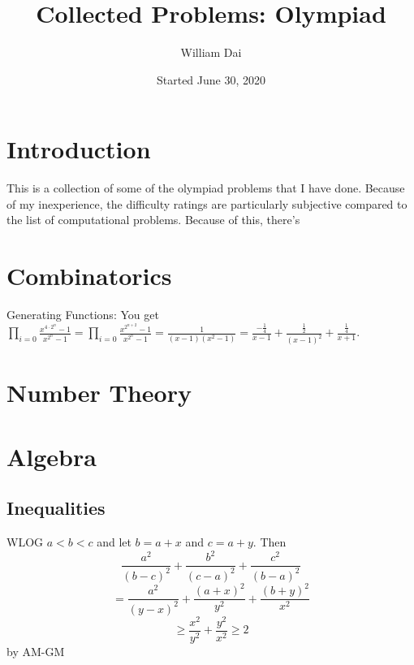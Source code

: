 \documentclass[11pt]{article}
\title{Collected Problems: Olympiad}
\author{William Dai}
\date{Started June 30, 2020}
\begin{document}
\maketitle

\section{Introduction}
This is a collection of some of the olympiad problems that I have done. Because of my inexperience, the difficulty ratings are particularly subjective compared to the list of computational problems. Because of this, there\rq{s}
\section{Combinatorics}

\begin{sol} Generating Functions: You get $\prod_{i=0} \frac{x^{4\cdot 2^{n}}-1}{x^{2^n}-1}= \prod_{i=0} \frac{x^{2^{n+2}}-1}{x^{2^n}-1}=\frac{1}{(x-1)(x^2-1)}=\frac{-\frac{1}{4}}{x-1}+\frac{\frac{1}{2}}{(x-1)^2}+\frac{\frac{1}{4}}{x+1}.$
\end{sol}


\setcounter{problem}{0}
\section{Number Theory}

\setcounter{problem}{0}
\section{Algebra}

\subsection{Inequalities}

\sol WLOG $a<b<c$ and let $b=a+x$ and $c=a+y$. Then
$$\frac{a^2}{(b-c)^2}+\frac{b^2}{(c-a)^2}+\frac{c^2}{(b-a)^2}$$
$$=\frac{a^2}{(y-x)^2} + \frac{(a+x)^2}{y^2}+\frac{(b+y)^2}{x^2}$$
$$\ge \frac{x^2}{y^2}+\frac{y^2}{x^2}\ge 2$$
by AM-GM

\end{document}
